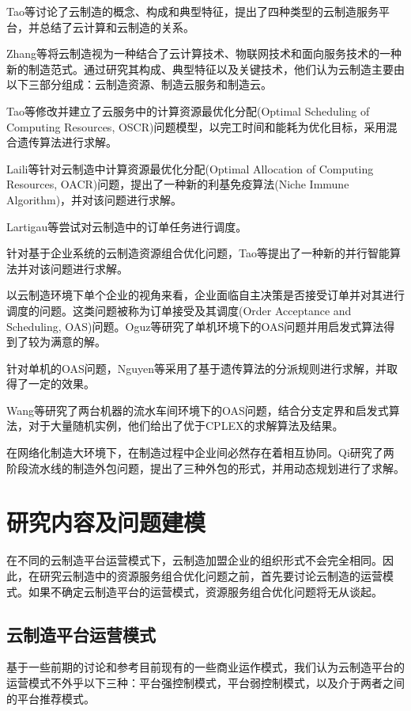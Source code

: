 \documentclass[UTF8]{ctexart}
\begin{document}
Tao等\cite{Tao2011}讨论了云制造的概念、构成和典型特征，提出了四种类型的云制造服务平台，并总结了云计算和云制造的关系。

Zhang等\cite{Zhang2014}将云制造视为一种结合了云计算技术、物联网技术和面向服务技术的一种新的制造范式。通过研究其构成、典型特征以及关键技术，他们认为云制造主要由以下三部分组成：云制造资源、制造云服务和制造云。

Tao等\cite{Tao2014}修改并建立了云服务中的计算资源最优化分配(Optimal Scheduling of Computing Resources, OSCR)问题模型，以完工时间和能耗为优化目标，采用混合遗传算法进行求解。

Laili等\cite{Laili2012}针对云制造中计算资源最优化分配(Optimal Allocation of Computing
Resources, OACR)问题，提出了一种新的利基免疫算法(Niche Immune Algorithm)，并对该问题进行求解。

Lartigau等\cite{6227791}尝试对云制造中的订单任务进行调度。

针对基于企业系统的云制造资源组合优化问题，Tao等\cite{6376181}提出了一种新的并行智能算法并对该问题进行求解。

以云制造环境下单个企业的视角来看，企业面临自主决策是否接受订单并对其进行调度的问题。这类问题被称为订单接受及其调度(Order Acceptance and Scheduling, OAS)问题。Oguz等\cite{Og2010}研究了单机环境下的OAS问题并用启发式算法得到了较为满意的解。

针对单机的OAS问题，Nguyen等\cite{Nguyen2015}采用了基于遗传算法的分派规则进行求解，并取得了一定的效果。

Wang等\cite{Wang2013}研究了两台机器的流水车间环境下的OAS问题，结合分支定界和启发式算法，对于大量随机实例，他们给出了优于CPLEX的求解算法及结果。

在网络化制造大环境下，在制造过程中企业间必然存在着相互协同。Qi\cite{Qi2011}研究了两阶段流水线的制造外包问题，提出了三种外包的形式，并用动态规划进行了求解。


\section{研究内容及问题建模}
\label{model}
在不同的云制造平台运营模式下，云制造加盟企业的组织形式不会完全相同。因此，在研究云制造中的资源服务组合优化问题之前，首先要讨论云制造的运营模式。如果不确定云制造平台的运营模式，资源服务组合优化问题将无从谈起。

\subsection{云制造平台运营模式}
\label{forms of platform}
基于一些前期的讨论和参考目前现有的一些商业运作模式，我们认为云制造平台的运营模式不外乎以下三种：平台强控制模式，平台弱控制模式，以及介于两者之间的平台推荐模式。
\end{document}
